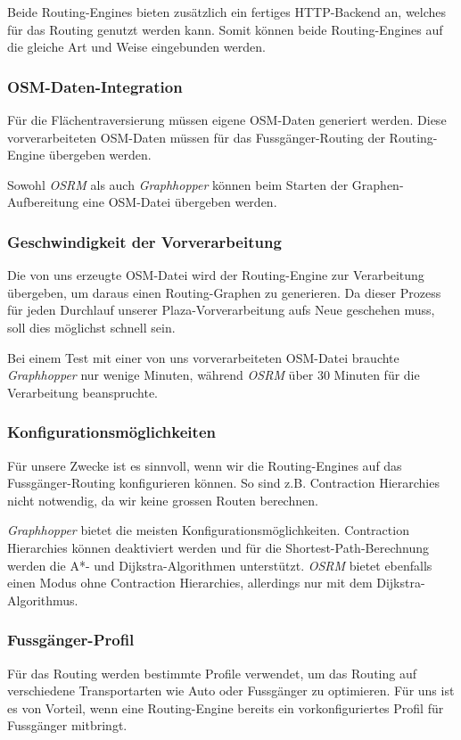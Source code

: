 Beide Routing-Engines bieten zusätzlich ein fertiges HTTP-Backend an, welches für das Routing genutzt werden kann. Somit können beide Routing-Engines auf die gleiche Art und Weise eingebunden werden.

\subsubsection{OSM-Daten-Integration}
\label{analyse:OSM-Daten-Integration}
Für die Flächentraversierung müssen eigene \ac{OSM}-Daten generiert werden. Diese vorverarbeiteten \ac{OSM}-Daten müssen für das Fussgänger-Routing der Routing-Engine übergeben werden.

Sowohl \emph{OSRM} als auch \emph{Graphhopper} können beim Starten der Graphen-Aufbereitung eine \ac{OSM}-Datei übergeben werden.

\subsubsection{Geschwindigkeit der Vorverarbeitung}
\label{analyse:Geschwindigkeit der Vorverarbeitung}
Die von uns erzeugte \ac{OSM}-Datei wird der Routing-Engine zur Verarbeitung übergeben, um daraus einen Routing-Graphen zu generieren. Da dieser Prozess für jeden Durchlauf unserer Plaza-Vorverarbeitung aufs Neue geschehen muss, soll dies möglichst schnell sein.

Bei einem Test mit einer von uns vorverarbeiteten OSM-Datei brauchte \emph{Graphhopper} nur wenige Minuten, während \emph{OSRM} über 30 Minuten für die Verarbeitung beanspruchte.

\subsubsection{Konfigurationsmöglichkeiten}
\label{analyse:Konfigurationsmöglichkeiten}
Für unsere Zwecke ist es sinnvoll, wenn wir die Routing-Engines auf das Fussgänger-Routing konfigurieren können. So sind z.B. Contraction Hierarchies nicht notwendig, da wir keine grossen Routen berechnen.

\emph{Graphhopper} bietet die meisten Konfigurationsmöglichkeiten. Contraction Hierarchies können deaktiviert werden und für die Shortest-Path-Berechnung werden die A*- und Dijkstra-Algorithmen \cite{astar} \cite{dijkstra_algorithm} unterstützt. \emph{OSRM} bietet ebenfalls einen Modus ohne Contraction Hierarchies, allerdings nur mit dem Dijkstra-Algorithmus.

\subsubsection{Fussgänger-Profil}
\label{analyse:Fussgänger-Profil}
Für das Routing werden bestimmte Profile verwendet, um das Routing auf verschiedene Transportarten wie Auto oder Fussgänger zu optimieren. Für uns ist es von Vorteil, wenn eine Routing-Engine bereits ein vorkonfiguriertes Profil für Fussgänger mitbringt.

